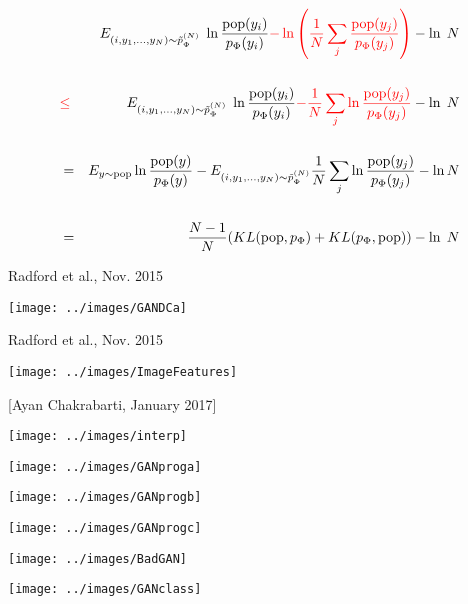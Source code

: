 {
{\huge
 \begin{eqnarray*}
    & & E_{(i,y_1,\ldots,y_{N}) \sim \tilde{p}_\Phi^{(N)}}\;\ln\frac{\mathrm{pop}(y_i)}{p_\Phi(y_i)} {\color{red} - \ln\left(\frac{1}{N}\sum_j \frac{\mathrm{pop}(y_j)}{p_\Phi(y_j)} \right)} - \ln\;N \\
    \\
    & {\color{red} \leq} & E_{(i,y_1,\ldots,y_{N}) \sim \tilde{p}_\Phi^{(N)}}\;\ln\frac{\mathrm{pop}(y_i)}{p_\Phi(y_i)} {\color{red} - \frac{1}{N} \sum_j \ln\frac{\mathrm{pop}(y_j)}{p_\Phi(y_j)}} - \ln\;N \\
    \\
    & = & E_{y \sim \mathrm{pop}} \ln \frac{\mathrm{pop}(y)}{p_\Phi(y)} -  E_{(i,y_1,\ldots,y_N) \sim \tilde{p}^{(N)}_\Phi} \frac{1}{N} \sum_j \ln\frac{\mathrm{pop}(y_j)}{p_\Phi(y_j)} - \ln N \\
    \\
    & = & \frac{N-1}{N}(KL(\mathrm{pop},p_\Phi) + KL(p_\Phi,\mathrm{pop})) - \ln\;N \\
  \end{eqnarray*}
}

{Radford et al., Nov. 2015}

\centerline{\texttt{[image: ../images/GANDCa]}}

{Radford et al., Nov. 2015}

\centerline{\texttt{[image: ../images/ImageFeatures]}}


[Ayan Chakrabarti, January 2017]

\centerline{\texttt{[image: ../images/interp]}}

\centerline{\texttt{[image: ../images/GANproga]}}

\centerline{\texttt{[image: ../images/GANprogb]}}

\centerline{\texttt{[image: ../images/GANprogc]}}



\centerline{\texttt{[image: ../images/BadGAN]}}


\centerline{\texttt{[image: ../images/GANclass]}}

}
